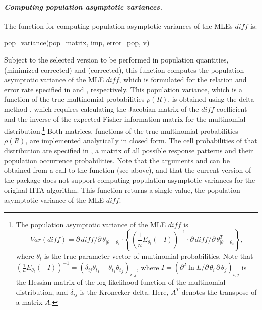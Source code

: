 \documentclass[nojss]{jss}
\begin{document}
\paragraph{\it Computing population asymptotic variances.}
The function for computing population asymptotic variances of the MLEs $\mathit{diff}$ 
\citep[Section \ref{subsec:IITA};][]{US:10} is:
\begin{Code}
pop_variance(pop_matrix, imp, error_pop, v)
\end{Code}
Subject to the selected version to be performed in population quantities,  (minimized corrected) and  (corrected),
this function computes the population asymptotic variance of the MLE $\mathit{diff}$, 
which is formulated for the relation and 
error rate specified in  and , respectively. 
This population variance, which is a function of the true multinomial probabilities $\rho(R)$, 
is obtained using the delta method \citep[e.g., see][]{CB:02}, 
which requires calculating the Jacobian matrix of the 
$\mathit{diff}$ coefficient and the inverse of the expected Fisher information matrix for the multinomial distribution.\footnote{\label{footnote:asympvar}The population asymptotic variance 
of the MLE $\mathit{diff}$ is
\[
Var(\mathit{diff})= \partial \,\mathit{diff} / \partial \,\theta_{|\theta=\theta_t} \cdot
\left\{\left(\frac{1}{n}E_{\theta_t}(-I)\right)^{-1} \cdot \partial \,\mathit{diff} / \partial 
\,\theta_{|\theta=\theta_t}^T\right\},
\]
where $\theta_t$ is the true parameter vector of multinomial probabilities. Note that 
$(\frac{1}{n}E_{\theta_t}(-I))^{-1}=\left(\delta_{ij}{\theta_t}_i-{\theta_t}_i{\theta_t}_j\right)_{i,j}$,
where $I=\left(\partial^2 \ln L / \partial \,\theta_i \,\partial \,\theta_j\right)_{i,j}$
is the Hessian matrix of the log likelihood function of the multinomial distribution,
and $\delta_{ij}$ is the Kronecker delta. Here, $A^T$ denotes the transpose of a matrix $A$.} 
Both matrices, functions of the true multinomial probabilities $\rho(R)$,
are implemented analytically in closed form. 
The cell probabilities of that distribution are specified in , a matrix of all possible response patterns and their population occurrence probabilities.
Note that the arguments  and  can be obtained from a call to the function  (see above),
and that the current version of the package  does not support computing population asymptotic variances for the original IITA algorithm.
This function returns a single value, the population asymptotic variance of the MLE $\mathit{diff}$.
\end{document}
